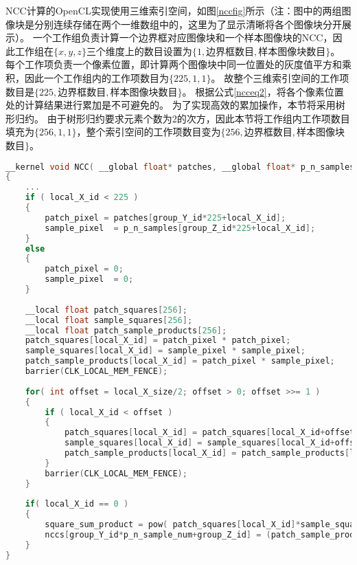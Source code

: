 NCC计算的OpenCL实现使用三维索引空间，如图\ref{nccfig}所示（注：图中的两组图像块是分别连续存储在两个一维数组中的，这里为了显示清晰将各个图像块分开展示）。
一个工作组负责计算一个边界框对应图像块和一个样本图像块的NCC，因此工作组在$\{x, y, z\}$三个维度上的数目设置为$\{1, $边界框数目$, $样本图像块数目$\}$。
每个工作项负责一个像素位置，即计算两个图像块中同一位置处的灰度值平方和乘积，因此一个工作组内的工作项数目为$\{225, 1, 1\}$。
故整个三维索引空间的工作项数目是$\{225, $边界框数目$, $样本图像块数目$\}$。
根据公式\ref{ncceq2}，将各个像素位置处的计算结果进行累加是不可避免的。
为了实现高效的累加操作，本节将采用树形归约。
由于树形归约要求元素个数为2的次方，因此本节将工作组内工作项数目填充为$\{256, 1, 1\}$，整个索引空间的工作项数目变为$\{256, $边界框数目$, $样本图像块数目$\}$。

\begin{table}
\caption{NCC计算的Kernel程序}
\label{ncccode}
\begin{lstlisting}[language=C++, basicstyle=\ttfamily\footnotesize]    
__kernel void NCC( __global float* patches, __global float* p_n_samples, int p_n_sample_num, __global float* nccs )
{		
    ...
    if ( local_X_id < 225 ) 
    {
        patch_pixel = patches[group_Y_id*225+local_X_id];
        sample_pixel  = p_n_samples[group_Z_id*225+local_X_id];
    }
    else
    {
        patch_pixel = 0;
        sample_pixel  = 0;
    }
    
    __local float patch_squares[256];
    __local float sample_squares[256];
    __local float patch_sample_products[256];
    patch_squares[local_X_id] = patch_pixel * patch_pixel;
    sample_squares[local_X_id] = sample_pixel * sample_pixel;
    patch_sample_products[local_X_id] = patch_pixel * sample_pixel;	
    barrier(CLK_LOCAL_MEM_FENCE);
    
    for( int offset = local_X_size/2; offset > 0; offset >>= 1 ) 
    {
        if ( local_X_id < offset ) 
        {
            patch_squares[local_X_id] = patch_squares[local_X_id+offset] + patch_squares[local_X_id];
            sample_squares[local_X_id] = sample_squares[local_X_id+offset] + sample_squares[local_X_id];
            patch_sample_products[local_X_id] = patch_sample_products[local_X_id+offset] + patch_sample_products[local_X_id];
        }
        barrier(CLK_LOCAL_MEM_FENCE);
    }
	
    if( local_X_id == 0 )
    {	
        square_sum_product = pow( patch_squares[local_X_id]*sample_squares[local_X_id], 0.5 );
        nccs[group_Y_id*p_n_sample_num+group_Z_id] = (patch_sample_products[local_X_id]/square_sum_product + 1) * 0.5;
    }
}
\end{lstlisting}
\end{table}

